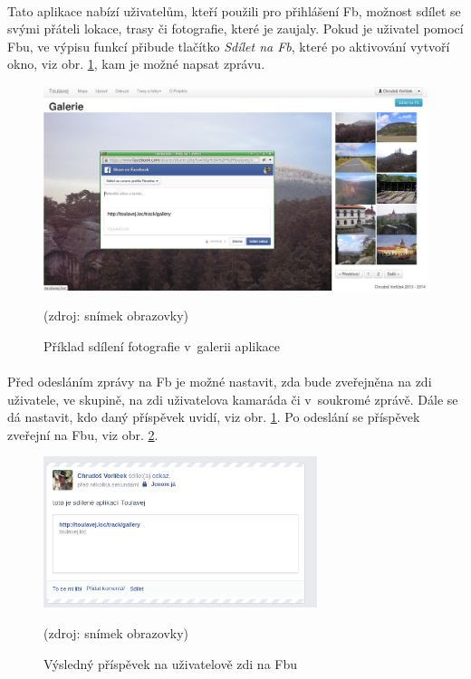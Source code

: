 \documentclass[11pt,a4paper,titlepage,oneside]{book}
\begin{document}
				\paragraph{}Tato aplikace nabízí uživatelům, kteří použili pro přihlášení \acl{Fb}, možnost sdílet se svými přáteli lokace, trasy či fotografie, které je zaujaly. Pokud je uživatel pomocí \acl{Fb}u, ve výpisu funkcí přibude tlačítko \textit{Sdílet na Fb}, které po aktivování vytvoří okno, viz obr. \ref{fig:fbShare1}, kam je možné napsat zprávu.
		\begin{figure}[!h]
			\begin{center}
				\includegraphics[width=12cm]{obrazky/toulavej/fbShareGallery.png}
				\caption{Příklad sdílení fotografie v~galerii aplikace }
				\label{fig:fbShare1}
				(zdroj: snímek obrazovky)
			\end{center}
		\end{figure}
	\paragraph{}Před odesláním zprávy na \acl{Fb} je možné nastavit, zda bude zveřejněna na zdi uživatele, ve skupině, na zdi uživatelova kamaráda či v~soukromé zprávě. Dále se dá nastavit, kdo daný příspěvek uvidí, viz obr. \ref{fig:fbShare1}.  Po odeslání se příspěvek zveřejní na \acl{Fb}u, viz obr. \ref{fig:fbShare2}.
		\begin{figure}[!h]
			\begin{center}
				\includegraphics[width=8cm]{obrazky/toulavej/fbSharefb.png}
				\caption{Výsledný příspěvek na uživatelově zdi na \acl{Fb}u}
				\label{fig:fbShare2}
				(zdroj: snímek obrazovky)
			\end{center}
		\end{figure}				
\end{document}
